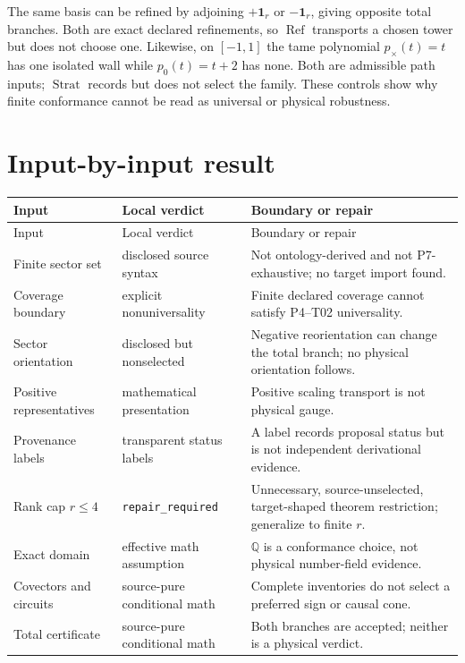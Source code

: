 \documentclass[11pt]{article}
\newcommand{\Q}{\mathbb{Q}}
\begin{document}
The same basis can be refined by adjoining $+\mathbf{1}_r$ or
$-\mathbf{1}_r$, giving opposite total branches.  Both are exact declared
refinements, so $\operatorname{Ref}$ transports a chosen tower but does not
choose one.  Likewise, on $[-1,1]$ the tame polynomial $p_\times(t)=t$ has one
isolated wall while $p_0(t)=t+2$ has none.  Both are admissible path inputs;
$\operatorname{Strat}$ records but does not select the family.  These controls
show why finite conformance cannot be read as universal or physical
robustness.

\section{Input-by-input result}

\begin{longtable}{p{}p{}p{}}
\toprule
Input & Local verdict & Boundary or repair \\
\midrule
\endfirsthead
\toprule
Input & Local verdict & Boundary or repair \\
\midrule
\endhead
Finite sector set & disclosed source syntax & Not ontology-derived and not P7-exhaustive; no target import found. \\
Coverage boundary & explicit nonuniversality & Finite declared coverage cannot satisfy P4--T02 universality. \\
Sector orientation & disclosed but nonselected & Negative reorientation can change the total branch; no physical orientation follows. \\
Positive representatives & mathematical presentation & Positive scaling transport is not physical gauge. \\
Provenance labels & transparent status labels & A label records proposal status but is not independent derivational evidence. \\
Rank cap $r\le4$ & \texttt{repair\_required} & Unnecessary, source-unselected, target-shaped theorem restriction; generalize to finite $r$. \\
Exact domain & effective math assumption & $\Q$ is a conformance choice, not physical number-field evidence. \\
Covectors and circuits & source-pure conditional math & Complete inventories do not select a preferred sign or causal cone. \\
Total certificate & source-pure conditional math & Both branches are accepted; neither is a physical verdict. \\

\end{longtable}
\end{document}

